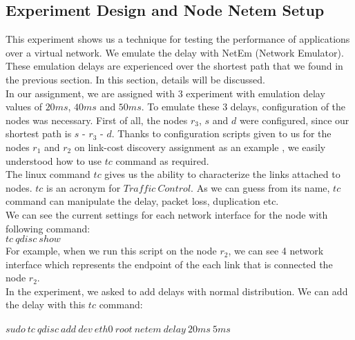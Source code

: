 \documentclass[conference]{IEEEtran}
\begin{document}
\subsection{Experiment Design and Node Netem Setup}

This experiment shows us a technique for testing the performance of applications over a virtual network. We emulate the delay with NetEm (Network Emulator). These emulation delays are experienced over the shortest path that we found in the previous section. In this section, details will be discussed. \\

In our assignment, we are assigned with 3 experiment with emulation delay values of $20ms$, $40ms$ and $50ms$. To emulate these 3 delays, configuration of the nodes was necessary. First of all, the nodes $r_3$, $s$ and $d$ were configured, since our shortest path is $s$ - $r_3$ - $d$. Thanks to configuration scripts given to us for the nodes $r_1$ and $r_2$ on link-cost discovery assignment as an example , we easily understood how to use $tc$ command as required. \\

The linux command $tc$ gives us the ability to characterize the links attached to nodes. $tc$ is an acronym for $Traffic\ Control$. As we can guess from its name, $tc$ command can manipulate the delay, packet loss, duplication etc. \\
 
We can see the current settings for each network interface for the node with following command: \\

\hspace{25mm} %
$tc\ qdisc\ show$  \\

For example, when we run this script on the node $r_2$, we can see 4 network interface which represents the endpoint of the each link that is connected the node $r_2$. \\

In the experiment, we asked to add delays with normal distribution. We can add the delay with this $tc$ command: \\
\\
$sudo\ tc\ qdisc\ add\ dev\ eth0\ root\ netem\ delay\ 20ms\ 5ms$  \\
\end{document}
